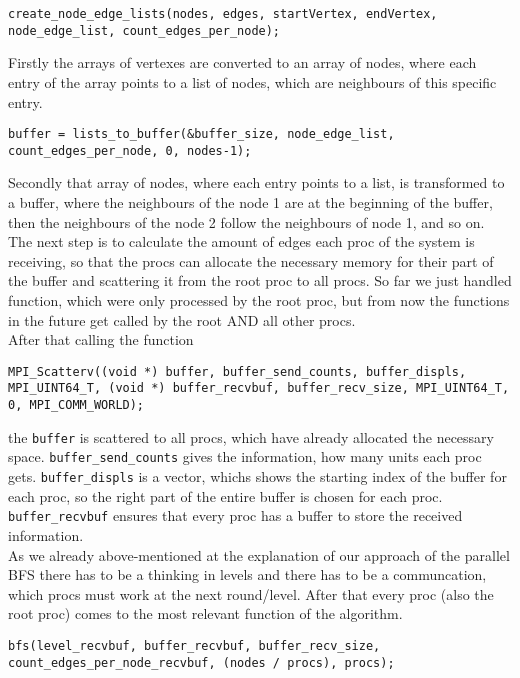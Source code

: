 \documentclass[11pt,a4paper]{article}
\begin{document}
\begin{lstlisting}
create_node_edge_lists(nodes, edges, startVertex, endVertex, node_edge_list, count_edges_per_node);
\end{lstlisting}
Firstly the arrays of vertexes are converted to an array of nodes, where each entry of the array points to a list of nodes, which are neighbours of this specific entry.
\begin{lstlisting}
buffer = lists_to_buffer(&buffer_size, node_edge_list, count_edges_per_node, 0, nodes-1);
\end{lstlisting}
Secondly that array of nodes, where each entry points to a list, is transformed to a buffer, where the neighbours of the node 1 are at the beginning of the buffer, then the neighbours of the node 2 follow the neighbours of node 1, and so on.
The next step is to calculate the amount of edges each proc of the system is receiving, so that the procs can allocate the necessary memory for their part of the buffer and scattering it from the root proc to all procs.  So far we just handled function, which were only processed by the root proc, but from now the functions in the future get called by the root AND all other procs. \\
After that calling the function
\begin{lstlisting}
MPI_Scatterv((void *) buffer, buffer_send_counts, buffer_displs, MPI_UINT64_T, (void *) buffer_recvbuf, buffer_recv_size, MPI_UINT64_T, 0, MPI_COMM_WORLD);
\end{lstlisting}
the \lstinline{buffer} is scattered to all procs, which have already allocated the necessary space. \lstinline{buffer_send_counts} gives the information, how many units each proc gets. \lstinline{buffer_displs} is a vector, whichs shows the starting index of the buffer for each proc, so the right part of the entire buffer is chosen for each proc. \lstinline{buffer_recvbuf} ensures that every proc has a buffer to store the received information.\\
As we already above-mentioned at the explanation of our approach of the parallel BFS there has to be a thinking in levels and there has to be a communcation, which procs must work at the next round/level.
After that every proc (also the root proc) comes to the most relevant function of the algorithm.
\begin{lstlisting}
bfs(level_recvbuf, buffer_recvbuf, buffer_recv_size, count_edges_per_node_recvbuf, (nodes / procs), procs);
\end{lstlisting}
\end{document}

